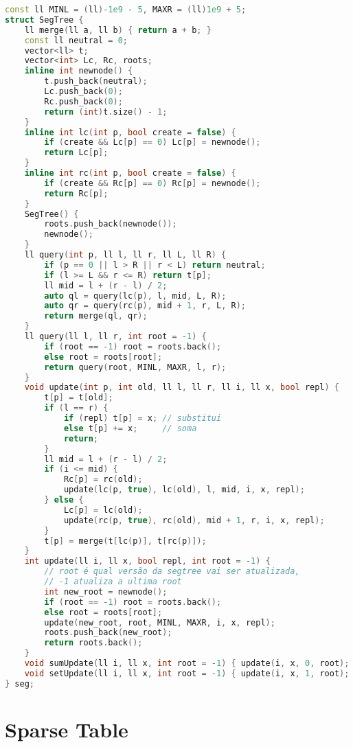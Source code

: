 \documentclass[10pt, a4paper, oneside]{book}
\begin{document}
\begin{lstlisting}[language=C++]
const ll MINL = (ll)-1e9 - 5, MAXR = (ll)1e9 + 5;
struct SegTree {
    ll merge(ll a, ll b) { return a + b; }
    const ll neutral = 0;
    vector<ll> t;
    vector<int> Lc, Rc, roots;
    inline int newnode() {
        t.push_back(neutral);
        Lc.push_back(0);
        Rc.push_back(0);
        return (int)t.size() - 1;
    }
    inline int lc(int p, bool create = false) {
        if (create && Lc[p] == 0) Lc[p] = newnode();
        return Lc[p];
    }
    inline int rc(int p, bool create = false) {
        if (create && Rc[p] == 0) Rc[p] = newnode();
        return Rc[p];
    }
    SegTree() {
        roots.push_back(newnode());
        newnode();
    }
    ll query(int p, ll l, ll r, ll L, ll R) {
        if (p == 0 || l > R || r < L) return neutral;
        if (l >= L && r <= R) return t[p];
        ll mid = l + (r - l) / 2;
        auto ql = query(lc(p), l, mid, L, R);
        auto qr = query(rc(p), mid + 1, r, L, R);
        return merge(ql, qr);
    }
    ll query(ll l, ll r, int root = -1) {
        if (root == -1) root = roots.back();
        else root = roots[root];
        return query(root, MINL, MAXR, l, r);
    }
    void update(int p, int old, ll l, ll r, ll i, ll x, bool repl) {
        t[p] = t[old];
        if (l == r) {
            if (repl) t[p] = x; // substitui
            else t[p] += x;     // soma
            return;
        }
        ll mid = l + (r - l) / 2;
        if (i <= mid) {
            Rc[p] = rc(old);
            update(lc(p, true), lc(old), l, mid, i, x, repl);
        } else {
            Lc[p] = lc(old);
            update(rc(p, true), rc(old), mid + 1, r, i, x, repl);
        }
        t[p] = merge(t[lc(p)], t[rc(p)]);
    }
    int update(ll i, ll x, bool repl, int root = -1) {
        // root é qual versão da segtree vai ser atualizada,
        // -1 atualiza a ultima root
        int new_root = newnode();
        if (root == -1) root = roots.back();
        else root = roots[root];
        update(new_root, root, MINL, MAXR, i, x, repl);
        roots.push_back(new_root);
        return roots.back();
    }
    void sumUpdate(ll i, ll x, int root = -1) { update(i, x, 0, root); }
    void setUpdate(ll i, ll x, int root = -1) { update(i, x, 1, root); }
} seg;
\end{lstlisting}
\hfill

\section{Sparse Table}
\end{document}
